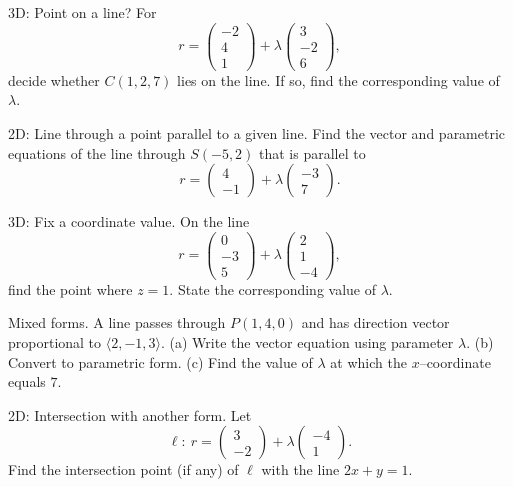 \documentclass[11pt]{article}
\def\textbf#1{#1}%
\def\mathbf#1{#1}%
\newcounter{question}
\begin{document}
\begin{question}
\textbf{3D: Point on a line?}
For
\[
\mathbf{r}=\begin{pmatrix}-2\\4\\1\end{pmatrix}+\lambda\begin{pmatrix}3\\-2\\6\end{pmatrix},
\]
decide whether $C(1,2,7)$ lies on the line. If so, find the corresponding value of $\lambda$.
\end{question}

\begin{question}
\textbf{2D: Line through a point parallel to a given line.}
Find the vector and parametric equations of the line through $S(-5,2)$ that is parallel to
\[
\mathbf{r}=\begin{pmatrix}4\\-1\end{pmatrix}+\lambda\begin{pmatrix}-3\\7\end{pmatrix}.
\]
\end{question}

\begin{question}
\textbf{3D: Fix a coordinate value.}
On the line
\[
\mathbf{r}=\begin{pmatrix}0\\-3\\5\end{pmatrix}+\lambda\begin{pmatrix}2\\1\\-4\end{pmatrix},
\]
find the point where $z=1$. State the corresponding value of $\lambda$.
\end{question}

\begin{question}
\textbf{Mixed forms.}
A line passes through $P(1,4,0)$ and has direction vector proportional to $\langle 2,-1,3\rangle$.  
(a) Write the vector equation using parameter $\lambda$.  
(b) Convert to parametric form.  
(c) Find the value of $\lambda$ at which the $x$–coordinate equals $7$.
\end{question}

\begin{question}
\textbf{2D: Intersection with another form.}
Let
\[
\ell:\ \mathbf{r}=\begin{pmatrix}3\\-2\end{pmatrix}+\lambda\begin{pmatrix}-4\\1\end{pmatrix}.
\]
Find the intersection point (if any) of $\ell$ with the line $2x+y=1$.
\end{question}
\end{document}
